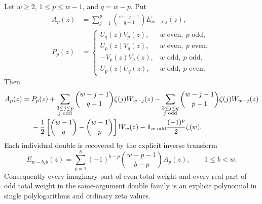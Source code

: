 \begin{theorem}\label{thm:binomial-parity}
Let $w\ge2$, $1\le p\le w-1$, and $q=w-p$. Put
\begin{align*}
 A_p(z)&=\sum_{j=1}^{p}\binom{w-j-1}{q-1}E_{w-j,j}(z),\\
 P_p(z)&=
 \begin{cases}
 U_q(z)V_p(z),&w\text{ even},\ p\text{ odd},\\
 U_p(z)V_q(z),&w\text{ even},\ p\text{ even},\\
 -V_p(z)V_q(z),&w\text{ odd},\ p\text{ odd},\\
 U_p(z)U_q(z),&w\text{ odd},\ p\text{ even}.
 \end{cases}
\end{align*}
Then
\begin{align}
 A_p(z)={}&P_p(z)
 +\sum_{\substack{3\le j\le p\\j\text{ odd}}}
       \binom{w-j-1}{q-1}\zeta(j)W_{w-j}(z)
 -\sum_{\substack{3\le j\le q\\j\text{ odd}}}
       \binom{w-j-1}{p-1}\zeta(j)W_{w-j}(z)\notag\\
 &-\frac12\left[\binom{w-1}{q}-\binom{w-1}{p}\right]W_w(z)
 -\boldsymbol{1}_{w\text{ odd}}\frac{(-1)^p}{2}\zeta(w).
 \label{eq:parity-A}
\end{align}
Each individual double is recovered by the explicit inverse transform
\begin{equation}\label{eq:parity-inverse}
 E_{w-b,b}(z)=\sum_{p=1}^{b}(-1)^{b-p}
                  \binom{w-p-1}{b-p}A_p(z),\qquad 1\le b<w.
\end{equation}
Consequently every imaginary part of even total weight and every real part
of odd total weight in the same-argument double family is an explicit
polynomial in single polylogarithms and ordinary zeta values.
\end{theorem}

